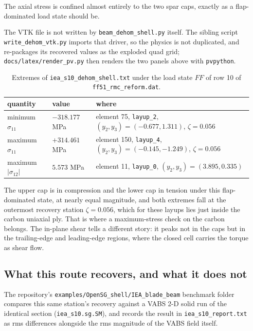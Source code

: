 The axial stress is confined almost entirely to the two spar caps, exactly as a
flap-dominated load state should be.

The VTK file is not written by \texttt{beam\_dehom\_shell.py} itself. The
sibling script \texttt{write\_dehom\_vtk.py} imports that driver, so the physics
is not duplicated, and re-packages its recovered values as the exploded quad
grid; \texttt{docs/latex/render\_pv.py} then renders the two panels above with
\texttt{pvpython}.

\begin{table}[htbp]
\centering
\small
\begin{tabular}{lll}
\toprule
quantity & value & where \\
\midrule
minimum $\sigma_{11}$ & $-318.177$ MPa & element 75, \texttt{layup\_2}, $(y_2,y_3) = (-0.677, 1.311)$, $\zeta = 0.056$ \\
maximum $\sigma_{11}$ & $+314.461$ MPa & element 150, \texttt{layup\_4}, $(y_2,y_3) = (-0.145, -1.249)$, $\zeta = 0.056$ \\
maximum $|\sigma_{12}|$ & $5.573$ MPa & element 11, \texttt{layup\_0}, $(y_2,y_3) = (3.895, 0.335)$ \\
\bottomrule
\end{tabular}
\caption{Extremes of \texttt{iea\_s10\_dehom\_shell.txt} under the load state
$FF$ of row 10 of \texttt{ff51\_rmc\_reform.dat}.}
\label{tab:shell-dehom-extremes}
\end{table}

The upper cap is in compression and the lower cap in tension under this
flap-dominated state, at nearly equal magnitude, and both extremes fall at the
outermost recovery station $\zeta = 0.056$, which for these layups lies just
inside the carbon uniaxial ply. That is where a maximum-stress check on the
carbon belongs. The in-plane shear tells a different story: it peaks not in the
caps but in the trailing-edge and leading-edge regions, where the closed cell
carries the torque as shear flow.

\subsection{What this route recovers, and what it does not}

The repository's \texttt{examples/OpenSG\_shell/IEA\_blade\_beam} benchmark folder
compares this same station's recovery against a VABS 2-D solid run of the
identical section (\texttt{iea\_s10.sg.SM}), and records the result in
\texttt{iea\_s10\_report.txt} as rms differences alongside the rms magnitude of
the VABS field itself.

